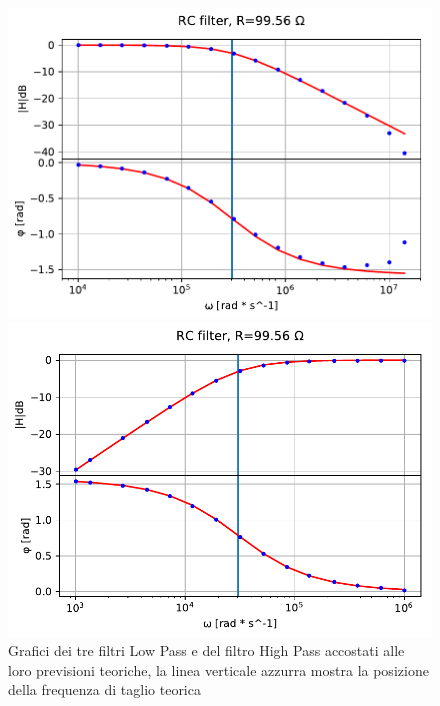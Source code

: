 \documentclass{article}
\begin{document}
\begin{figure}[H]
    \centering
    \begin{minipage}{0.5\textwidth}
        \centering
        \includegraphics[width=\textwidth]{bodeplot3.pdf} 
    \end{minipage}\hfill
    \begin{minipage}{0.5\textwidth}
        \centering
        \includegraphics[width=\textwidth]{bodeplot4.pdf} 
    \end{minipage}
    \caption{Grafici dei tre filtri Low Pass e del filtro High Pass accostati alle loro previsioni teoriche, la linea verticale azzurra mostra la posizione della frequenza di taglio teorica}
    \label{fig:RC_fil}
\end{figure}
\end{document}
